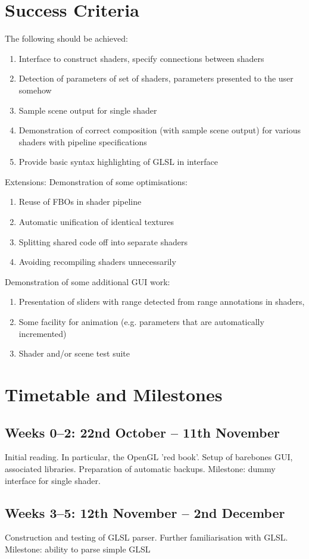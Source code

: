 \section*{Success Criteria}
The following should be achieved:
\begin{enumerate}
\item Interface to construct shaders, specify connections between shaders
\item Detection of parameters of set of shaders, parameters presented to the user somehow
\item Sample scene output for single shader
\item Demonstration of correct composition (with sample scene output) for various shaders with
pipeline specifications
\item Provide basic syntax highlighting of GLSL in interface
\end{enumerate}
Extensions:
Demonstration of some optimisations:
\begin{enumerate}
\item Reuse of FBOs in shader pipeline
\item Automatic unification of identical textures
\item Splitting shared code off into separate shaders
\item Avoiding recompiling shaders unnecessarily
\end{enumerate}
Demonstration of some additional GUI work:
\begin{enumerate}
\item Presentation of sliders with range detected from range annotations in shaders,
\item Some facility for animation (e.g. parameters that are automatically incremented)
\item Shader and/or scene test suite
\end{enumerate}

\section*{Timetable and Milestones}
\subsection*{Weeks 0--2: 22nd October -- 11th November}
Initial reading. In particular, the OpenGL 'red book'. Setup of barebones GUI, associated libraries.
Preparation of automatic backups.
Milestone: dummy interface for single shader.
\subsection*{Weeks 3--5: 12th November -- 2nd December}
Construction and testing of GLSL parser. Further familiarisation with GLSL.
Milestone: ability to parse simple GLSL
